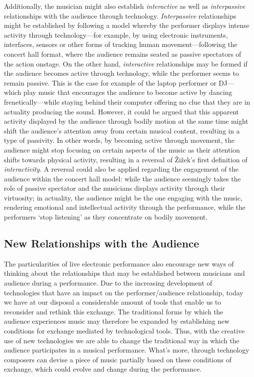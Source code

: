 Additionally, the musician might also establish \emph{interactive} as well as \emph{interpassive} relationships with the audience through technology. \emph{Interpassive} relationships might be established by following a model whereby the performer displays intense activity through technology---for example, by using electronic instruments, interfaces, sensors or other forms of tracking human movement---following the concert hall format, where the audience remains seated as passive spectators of the action onstage. On the other hand, \emph{interactive} relationships may be formed if the audience becomes active through technology, while the performer seems to remain passive. This is the case for example of the laptop performer or DJ---which play music that encourages the audience to become active by dancing frenetically---while staying behind their computer offering no clue that they are in actuality producing the sound. However, it could be argued that this apparent activity displayed by the audience through bodily motion at the same time might shift the audience's attention away from certain musical content, resulting in a type of passivity. In other words, by becoming active through movement, the audience might stop focusing on certain aspects of the music as their attention shifts towards physical activity, resulting in a reversal of \v{Z}i\v{z}ek's first definition of \emph{interactivity}. A reversal could also be applied regarding the engagement of the audience within the concert hall model: while the audience seemingly takes the role of passive spectator and the musicians displays activity through their virtuosity; in actuality, the audience might be the one engaging with the music, rendering emotional and intellectual activity through the performance, while the performers `stop listening' as they concentrate on bodily movement. 

\subsection{New Relationships with the Audience}

The particularities of live electronic performance also encourage new ways of thinking about the relationships that may be established between musicians and audience during a performance. Due to the increasing development of technologies that have an impact on the performer/audience relationship, today we have at our disposal a considerable amount of tools that enable us to reconsider and rethink this exchange. The traditional forms by which the audience experiences music may therefore be expanded by establishing new conditions for exchange mediated by technological tools. Thus, with the creative use of new technologies we are able to change the traditional way in which the audience participates in a musical performance. What's more, through technology composers can devise a piece of music partially based on these conditions of exchange, which could evolve and change during the performance. 

